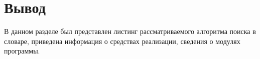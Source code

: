 

\clearpage



\clearpage



\clearpage



\section*{Вывод}
В данном разделе был представлен листинг рассматриваемого алгоритма поиска в словаре, приведена информация о средствах реализации, сведения о модулях программы.

